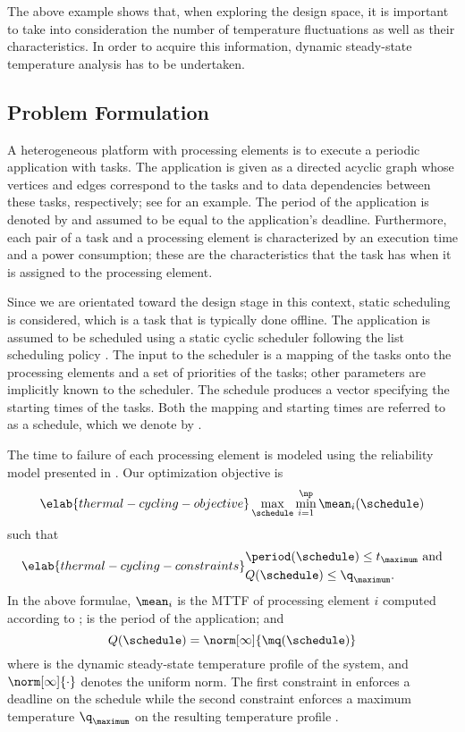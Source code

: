 The above example shows that, when exploring the design space, it is important
to take into consideration the number of temperature fluctuations as well as
their characteristics. In order to acquire this information, dynamic
steady-state temperature analysis has to be undertaken.

\subsection{Problem Formulation}

A heterogeneous platform with \np processing elements is to execute a periodic
application with \nt tasks. The application is given as a directed acyclic graph
whose vertices and edges correspond to the tasks and to data dependencies
between these tasks, respectively; see  for an
example. The period of the application is denoted by \period and assumed to be
equal to the application's deadline. Furthermore, each pair of a task and a
processing element is characterized by an execution time and a power
consumption; these are the characteristics that the task has when it is assigned
to the processing element.

Since we are orientated toward the design stage in this context, static
scheduling is considered, which is a task that is typically done offline. The
application is assumed to be scheduled using a static cyclic scheduler following
the list scheduling policy \cite{adam1974}. The input to the scheduler is a
mapping of the tasks onto the processing elements and a set of priorities of the
tasks; other parameters are implicitly known to the scheduler. The schedule
produces a vector specifying the starting times of the tasks. Both the mapping
and starting times are referred to as a schedule, which we denote by \schedule.

The time to failure of each processing element is modeled using the reliability
model presented in . Our optimization objective is
\begin{equation} \elab{thermal-cycling-objective}
  \max_{\schedule} \min_{i = 1}^\np \mean_i(\schedule)
\end{equation}
such that
\begin{align} \elab{thermal-cycling-constraints}
  \begin{split}
    & \period(\schedule) \leq t_\maximum \text{ and} \\
    & Q(\schedule) \leq \q_\maximum.
  \end{split}
\end{align}
In the above formulae, $\mean_i$ is the \ac{MTTF} of processing element $i$
computed according to ; \period is the period of
the application; and
\[
  Q(\schedule) = \norm[\infty]{\mq(\schedule)}
\]
where \mq is the dynamic steady-state temperature profile of the system, and
$\norm[\infty]{\cdot}$ denotes the uniform norm. The first constraint in
 enforces a deadline on the schedule while the
second constraint enforces a maximum temperature $\q_\maximum$ on the resulting
temperature profile \mq.

